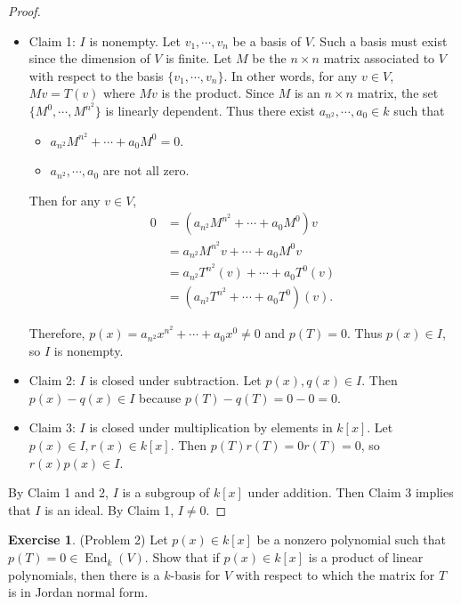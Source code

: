\documentclass[12pt, psamsfonts]{amsart}
\theoremstyle{definition}
\newtheorem*{exer}{Exercise}
\theoremstyle{remark}
\DeclareMathOperator{\End}{End}
\numberwithin{equation}{section}
\begin{document}
\begin{proof}
  $ $
  \begin{itemize}
    \item
      Claim 1: $I$ is nonempty.
      Let $v_1, \cdots, v_n$ be a basis of $V$.
      Such a basis must exist since the dimension of $V$ is finite.
      Let $M$ be the $n \times n$ matrix associated to $V$ with respect to the basis $\{ v_1, \cdots, v_n \}$.
      In other words, for any $v \in V$, $Mv = T(v)$ where $Mv$ is the product.
      Since $M$ is an $n \times n$ matrix, the set $\{ M^0, \cdots, M^{n^2} \}$ is linearly dependent.
      Thus there exist $a_{n^2}, \cdots, a_0 \in k$ such that
      \begin{itemize}
        \item
          $a_{n^2}M^{n^2} + \cdots + a_0M^0 = 0$.
        \item
          $a_{n^2}, \cdots, a_0$ are not all zero.
      \end{itemize}
      Then for any $v \in V$,
      \begin{align*}
        0 &= (a_{n^2}M^{n^2} + \cdots + a_0M^0)v \\
          &= a_{n^2}M^{n^2}v + \cdots + a_0M^0v \\
          &= a_{n^2}T^{n^2}(v) + \cdots + a_0T^0(v) \\
          &= (a_{n^2}T^{n^2} + \cdots + a_0T^0)(v).
      \end{align*}

      Therefore, $p(x) = a_{n^2}x^{n^2} + \cdots + a_0x^0 \ne 0$ and $p(T) = 0$.
      Thus $p(x) \in I$, so $I$ is nonempty.
    \item
      Claim 2: $I$ is closed under subtraction.
      Let $p(x), q(x) \in I$.
      Then $p(x) - q(x) \in I$ because $p(T) - q(T) = 0 - 0 = 0$.
    \item
      Claim 3: $I$ is closed under multiplication by elements in $k[x]$.
      Let $p(x) \in I, r(x) \in k[x]$.
      Then $p(T)r(T) = 0r(T) = 0$, so $r(x)p(x) \in I$.
  \end{itemize}
  By Claim 1 and 2, $I$ is a subgroup of $k[x]$ under addition.
  Then Claim 3 implies that $I$ is an ideal.
  By Claim 1, $I \ne 0$.
\end{proof}

\begin{exer}{(Problem 2)}
  Let $p(x) \in k[x]$ be a nonzero polynomial such that $p(T) = 0 \in \End_k(V)$.
  Show that if $p(x) \in k[x]$ is a product of linear polynomials, then there is a $k$-basis for $V$ with respect to which the matrix for $T$ is in Jordan normal form.
\end{exer}
\end{document}
